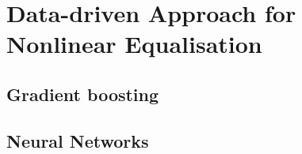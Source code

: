\chapter{Data-driven Approach for Nonlinear Equalisation}


\section{Gradient boosting}


\section{Neural Networks}


% 

